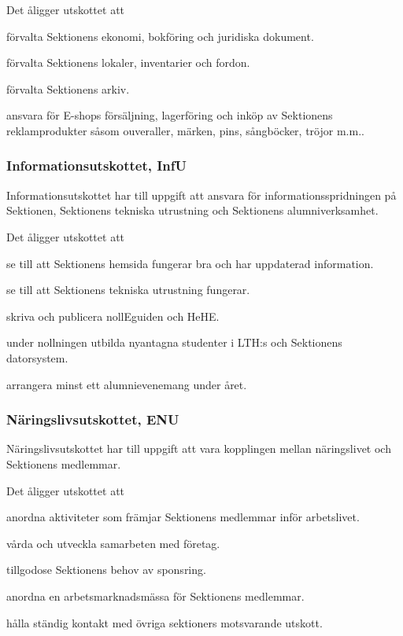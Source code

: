 \documentclass[10pt]{article}
\begin{document}
Det åligger utskottet att
\begin{tightdashlist}
\item förvalta Sektionens ekonomi, bokföring och juridiska dokument.
\item förvalta Sektionens lokaler, inventarier och fordon.
\item förvalta Sektionens arkiv.
\item ansvara för E-shops försäljning, lagerföring och inköp av Sektionens reklamprodukter såsom ouveraller, märken, pins, sångböcker, tröjor m.m..
\end{tightdashlist}

\subsubsection{Informationsutskottet, InfU}
Informationsutskottet har till uppgift att ansvara för informationsspridningen på Sektionen, Sektionens tekniska utrustning och Sektionens alumniverksamhet.

Det åligger utskottet att
\begin{tightdashlist}
    \item se till att Sektionens hemsida fungerar bra och har uppdaterad information.
    \item se till att Sektionens tekniska utrustning fungerar.
    \item skriva och publicera nollEguiden och HeHE.
    \item under nollningen utbilda nyantagna studenter i LTH:s och Sektionens datorsystem.
    \item arrangera minst ett alumnievenemang under året.
\end{tightdashlist}

\subsubsection{Näringslivsutskottet, ENU}
Näringslivsutskottet har till uppgift att vara kopplingen mellan näringslivet och Sektionens medlemmar.

Det åligger utskottet att
\begin{tightdashlist}
\item anordna aktiviteter som främjar Sektionens medlemmar inför arbetslivet.
\item vårda och utveckla samarbeten med företag.
\item tillgodose Sektionens behov av sponsring.
\item anordna en arbetsmarknadsmässa för Sektionens medlemmar.
\item hålla ständig kontakt med övriga sektioners motsvarande utskott.
\end{tightdashlist}
\end{document}

